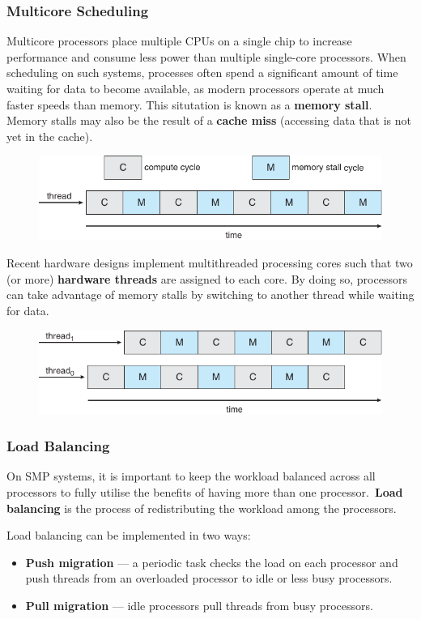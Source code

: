 \documentclass{article}
\begin{document}
\subsubsection{Multicore Scheduling}
Multicore processors place multiple CPUs on a single chip to increase
performance and consume less power than multiple single-core
processors. When scheduling on such systems, processes often spend a
significant amount of time waiting for data to become available, as
modern processors operate at much faster speeds than memory. This
situtation is known as a \textbf{memory stall}. Memory stalls may also
be the result of a \textbf{cache miss} (accessing data that is not yet
in the cache).
\begin{figure}[H]
    \centering
    \includegraphics[width = 0.8\linewidth]{figures/memory_stall.pdf}
\end{figure}
Recent hardware designs implement multithreaded processing cores such
that two (or more) \textbf{hardware threads} are assigned to each core.
By doing so, processors can take advantage of memory stalls by switching
to another thread while waiting for data.
\begin{figure}[H]
    \centering
    \includegraphics[width = 0.8\linewidth]{figures/memory_stall_2.pdf}
\end{figure}
\subsubsection{Load Balancing}
On SMP systems, it is important to keep the workload balanced across
all processors to fully utilise the benefits of having more than one
processor.\ \textbf{Load balancing} is the process of redistributing
the workload among the processors.

Load balancing can be implemented in two ways:
\begin{itemize}
    \item \textbf{Push migration} --- a periodic task checks the load on
          each processor and push threads from an overloaded processor to
          idle or less busy processors.
    \item \textbf{Pull migration} --- idle processors pull threads from
          busy processors.
\end{itemize}
\end{document}
